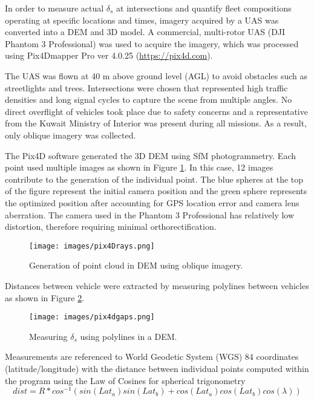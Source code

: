 In order to measure actual $\delta_{s}$ at intersections and quantify fleet compositions operating at specific locations and times, imagery acquired by a UAS was converted into a DEM and 3D model. A commercial, multi-rotor UAS (DJI Phantom 3 Professional) was used to acquire the imagery, which was processed using Pix4Dmapper Pro ver 4.0.25 (\url{https://pix4d.com}).

The UAS was flown at 40 m above ground level (AGL) to avoid obstacles such as streetlights and trees. Intersections were chosen that represented high traffic densities and long signal cycles to capture the scene from multiple angles. No direct overflight of vehicles took place due to safety concerns and a representative from the Kuwait Ministry of Interior was present during all missions. As a result, only oblique imagery was collected. 

The Pix4D software generated the 3D DEM using SfM photogrammetry. Each point used multiple images as shown in Figure \ref{fig:pix4Drays}. In this case, 12 images contribute to the generation of the individual point. The blue spheres at the top of the figure represent the initial camera position and the green sphere represents the optimized position after accounting for GPS location error and camera lens aberration. The camera used in the Phantom 3 Professional has relatively low distortion, therefore requiring minimal orthorectification.
%
\begin{figure}[H]
\texttt{[image: images/pix4Drays.png]} 
\caption{Generation of point cloud in DEM using oblique imagery.}
\label{fig:pix4Drays}
\end{figure}
%

Distances between vehicle were extracted by measuring polylines between vehicles as shown in Figure \ref{fig:pix4Dgaps}.
%
\begin{figure}[H]
\texttt{[image: images/pix4dgaps.png]} 
\caption{Measuring $\delta_{s}$ using polylines in a DEM.}
\label{fig:pix4Dgaps}
\end{figure}
%
Measurements are referenced to World Geodetic System (WGS) 84 coordinates (latitude/longitude) with the distance between individual points computed within the program using the Law of Cosines for spherical trigonometry \citep{Sinnott1984}
%
\begin{equation}
\label{eq:distTrig}
dist = R * cos^{-1}(sin(Lat_{a})sin(Lat_{b}) + cos(Lat_{a})cos(Lat_{b})cos(\lambda))
\end{equation}

